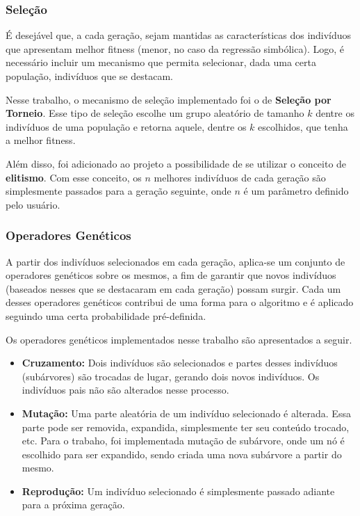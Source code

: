 \documentclass[12pt]{article}
\begin{document}
\subsubsection{Seleção}

É desejável que, a cada geração, sejam mantidas as características dos indivíduos que
apresentam melhor fitness (menor, no caso da regressão simbólica). Logo, é necessário
incluir um mecanismo que permita selecionar, dada uma certa população, indivíduos que
se destacam.

Nesse trabalho, o mecanismo de seleção implementado foi o de \textbf{Seleção por Torneio}.
Esse tipo de seleção escolhe um grupo aleatório de tamanho $ k $ dentre os indivíduos
de uma população e retorna aquele, dentre os $ k $ escolhidos, que tenha a melhor fitness.

Além disso, foi adicionado ao projeto a possibilidade de se utilizar o conceito de 
\textbf{elitismo}. Com esse conceito, os $ n $ melhores indivíduos de cada geração são
simplesmente passados para a geração seguinte, onde $ n $ é um parâmetro definido pelo
usuário.

\subsubsection{Operadores Genéticos}

A partir dos indivíduos selecionados em cada geração, aplica-se um conjunto de operadores
genéticos sobre os mesmos, a fim de garantir que novos indivíduos (baseados nesses que
se destacaram em cada geração) possam surgir. Cada um desses operadores genéticos contribui
de uma forma para o algoritmo e é aplicado seguindo uma certa probabilidade pré-definida.

Os operadores genéticos implementados nesse trabalho são apresentados a seguir.

\begin{itemize}
 \item \textbf{Cruzamento:} Dois indivíduos são selecionados e partes desses indivíduos
 (subárvores) são trocadas de lugar, gerando dois novos indivíduos. Os indivíduos pais
 não são alterados nesse processo.
 
 \item \textbf{Mutação:} Uma parte aleatória de um indivíduo selecionado é alterada.
 Essa parte pode ser removida, expandida, simplesmente ter seu conteúdo trocado, etc.
 Para o trabaho, foi implementada mutação de subárvore, onde um nó é escolhido para
 ser expandido, sendo criada uma nova subárvore a partir do mesmo.
 
 \item \textbf{Reprodução:} Um indivíduo selecionado é simplesmente passado adiante para
 a próxima geração.
\end{itemize}
\end{document}
